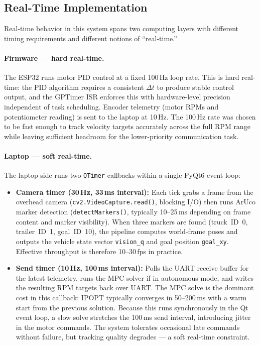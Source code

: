 \documentclass[11pt, letterpaper]{article}
\begin{document}
\subsection{Real-Time Implementation}

Real-time behavior in this system spans two computing layers with
different timing requirements and different notions of ``real-time.''

\paragraph{Firmware --- hard real-time.}
The ESP32 runs motor PID control at a fixed 100\,Hz loop rate. This is
hard real-time: the PID algorithm requires a consistent $\Delta t$ to
produce stable control output, and the GPTimer ISR enforces this with
hardware-level precision independent of task scheduling. Encoder
telemetry (motor RPMs and potentiometer reading) is sent to the laptop
at 10\,Hz. The 100\,Hz rate was chosen to be fast enough to track
velocity targets accurately across the full RPM range while leaving
sufficient headroom for the lower-priority communication task.

\paragraph{Laptop --- soft real-time.}
The laptop side runs two \texttt{QTimer} callbacks within a single
PyQt6 event loop:

\begin{itemize}
  \item \textbf{Camera timer (30\,Hz, 33\,ms interval):} Each tick
    grabs a frame from the overhead camera
    (\texttt{cv2.VideoCapture.read()}, blocking I/O) then runs ArUco
    marker detection (\texttt{detectMarkers()}, typically 10--25\,ms
    depending on frame content and marker visibility). When three
    markers are found (truck~ID~0, trailer~ID~1, goal~ID~10), the
    pipeline computes world-frame poses and outputs the vehicle state
    vector \texttt{vision\_q} and goal position \texttt{goal\_xy}.
    Effective throughput is therefore 10--30\,fps in practice.

  \item \textbf{Send timer (10\,Hz, 100\,ms interval):} Polls the UART
    receive buffer for the latest telemetry, runs the MPC solver if in
    autonomous mode, and writes the resulting RPM targets back over
    UART. The MPC solve is the dominant cost in this callback: IPOPT
    typically converges in 50--200\,ms with a warm start from the
    previous solution. Because this runs synchronously in the Qt event
    loop, a slow solve stretches the 100\,ms send interval, introducing
    jitter in the motor commands. The system tolerates occasional late
    commands without failure, but tracking quality degrades --- a
    soft real-time constraint.
\end{itemize}
\end{document}
